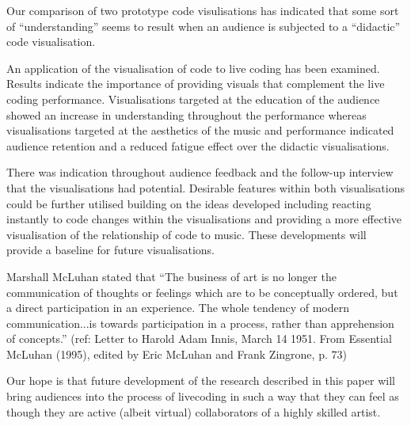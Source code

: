 \documentclass{sig-alternate}
\begin{document}
Our comparison of two prototype code visulisations has indicated that some sort of ``understanding'' seems to result when an audience is subjected to a ``didactic'' code visualisation. 

An application of the visualisation of code to live coding has been examined. Results indicate the importance of providing visuals that complement the live coding performance. Visualisations targeted at the education of the audience showed an increase in understanding throughout the performance whereas visualisations targeted at the aesthetics of the music and performance indicated audience retention and a reduced fatigue effect over the didactic visualisations.

There was indication throughout audience feedback and the follow-up interview that the visualisations had potential. Desirable features within both visualisations could be further utilised building on the ideas developed including reacting instantly to code changes within the visualisations and providing a more effective visualisation of the relationship of code to music. These developments will provide a baseline for future visualisations.

Marshall McLuhan stated that ``The business of art is no longer the communication of thoughts or feelings which are to be conceptually ordered, but a direct participation in an experience. The whole tendency of modern communication...is towards participation in a process, rather than apprehension of concepts.'' (ref: Letter to Harold Adam Innis, March 14 1951. From Essential McLuhan (1995), edited by Eric McLuhan and Frank Zingrone, p. 73)

Our hope is that future development of the research described in this paper will bring audiences into the process of livecoding in such a way that they can feel as though they are active (albeit virtual) collaborators of a highly skilled artist.

\nocite{*} %


%

\end{document}
